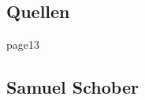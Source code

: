 \documentclass[12pt]{article}
\newcommand\blankpage{%
    \null
    \thispagestyle{empty}%
    \addtocounter{page}{-1}%
    \newpage}
\begin{document}
\newpage
\subsection{Quellen}
\label{subsec:sources}
\begingroup
\renewcommand{\section}[2]{}


\endgroup

\newpage
\blankpage
\blankpage
\section{Zeitaufzeichnung}
\setcounter{page}{13}
\subsection{Samuel Schober}
\end{document}
